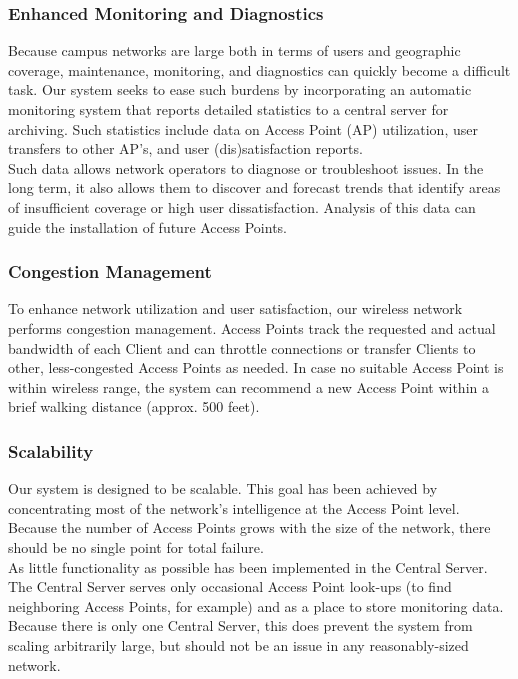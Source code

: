 \documentclass[11pt,twocolumn]{article}
\begin{document}
\subsubsection{Enhanced Monitoring and Diagnostics}
\indent Because campus networks are large both in terms of users and geographic coverage, maintenance, monitoring, and diagnostics can quickly become a
difficult task. Our system seeks to ease such burdens by incorporating an automatic monitoring system that reports detailed statistics to a central
server for archiving. Such statistics include data on Access Point (AP) utilization, user transfers to other AP's, and user (dis)satisfaction reports.\\
\indent Such data allows network operators to diagnose or troubleshoot issues. In the long term, it also allows them to discover and forecast trends that
identify areas of insufficient coverage or high user dissatisfaction. Analysis of this data can guide the installation of future Access Points.
\subsubsection{Congestion Management}
\indent To enhance network utilization and user satisfaction, our wireless network performs congestion management. Access Points track the requested
and actual bandwidth of each Client and can throttle connections or transfer Clients to other, less-congested Access Points as needed. In case no
suitable Access Point is within wireless range, the system can recommend a new Access Point within a brief walking distance (approx. 500 feet).
\subsubsection{Scalability}
\indent Our system is designed to be scalable. This goal has been achieved by concentrating most of the network's intelligence at the Access Point
level. Because the number of Access Points grows with the size of the network, there should be no single point for total failure. \\
\indent As little functionality as possible has been implemented in the Central Server. The Central Server serves only occasional Access Point look-ups (to
find neighboring Access Points, for example) and as a place to store monitoring data. Because there is only one Central Server, this does prevent the 
system from scaling arbitrarily large, but should not be an issue in any reasonably-sized network. 

\end{document}
